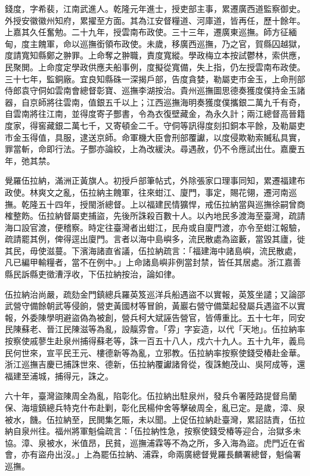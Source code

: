 \begin{pinyinscope}
錢度，字希裴，江南武進人。乾隆元年進士，授吏部主事，累遷廣西道監察御史。外授安徽徽州知府，累擢至方面。其為江安督糧道、河庫道，皆再任，歷十餘年。上嘉其久任奮勉。二十九年，授雲南布政使。三十三年，遷廣東巡撫。師方征緬甸，度主餽軍，命以巡撫銜領布政使。未歲，移廣西巡撫，乃之官，賀縣囚越獄，度請寬知縣鄭之翀罪。上命奪之翀職，責度寬縱。學政梅立本按試鬱林，索供應，民聚閧。上命度定學政供應夫船事例，度擬從寬備，失上指，仍左授雲南布政使。三十七年，監銅廠。宜良知縣硃一深揭戶部，告度貪婪，勒屬吏市金玉，上命刑部侍郎袁守侗如雲南會總督彰寶、巡撫李湖按治。貴州巡撫圖思德奏獲度僕持金玉諸器，自京師將往雲南，值銀五千以上；江西巡撫海明奏獲度僕攜銀二萬九千有奇，自雲南將往江南，並得度寄子酆書，令為衣復壁藏金，為永久計；兩江總督高晉籍度家，得窖藏銀二萬七千，又寄頓金二千。守侗等訊得度刻扣銅本平餘，及勒屬吏市金玉得值，具服，逮送京師。命軍機大臣會刑部覆讞，以度侵欺勒索贓私具實，罪當斬，命即行法。子酆亦論絞，上為改緩決。尋遇赦，仍不令應試出仕。嘉慶五年，弛其禁。

覺羅伍拉納，滿洲正黃旗人。初授戶部筆帖式，外除張家口理事同知，累遷福建布政使。林爽文之亂，伍拉納主餽軍，往來蚶江、廈門，事定，賜花翎，遷河南巡撫。乾隆五十四年，授閩浙總督。上以福建民情獷悍，戒伍拉納當與巡撫徐嗣曾商榷整飭。伍拉納督屬吏捕盜，先後所誅殺百數十人。以內地民多渡海至臺灣，疏請海口設官渡，便稽察。時定往臺灣者出蚶江，民舟或自廈門渡，亦令至蚶江報驗，疏請罷其例，俾得逕出廈門。言者以海中島嶼多，流民散處為盜藪，當毀其廬，徙其民，毋使滋蔓。下濱海諸直省議，伍拉納疏言：「福建海中諸島嶼，流民散處，凡已編甲輸糧者，當不在例中。」上命諸島嶼非例當封禁，皆任其居處。浙江嘉善縣民訴縣吏徵漕浮收，下伍拉納按治，論如律。

伍拉納治尚嚴，疏劾金門鎮總兵羅英笈巡洋兵船遇盜不以實報，英笈坐譴；又論邵武營守備餘朝武等侵餉，營吏黃國材等冒餉，黃巖右營守備葉起發屬兵遇盜不以實報，外委陳學明避盜偽為被創，營兵柯大斌誣告營官，皆傅重比。五十七年，同安民陳蘇老、晉江民陳滋等為亂，設靝雰會。「雰」字妄造，以代「天地」。伍拉納率按察使戚蓼生赴泉州捕得蘇老等，誅一百五十八人，戍六十九人。五十九年，義烏民何世來，宣平民王元、樓德新等為亂，立邪教。伍拉納率按察使錢受椿赴金華。浙江巡撫吉慶已捕誅世來、德新，伍拉納覆讞諸脅從，復誅鮑茂山、吳阿成等，還福建至浦城，捕得元，誅之。

六十年，臺灣盜陳周全為亂，陷彰化。伍拉納出駐泉州，發兵令署陸路提督烏蘭保、海壇鎮總兵特克什布赴剿，彰化民楊仲舍等擊破周全，亂已定。是歲，漳、泉被水，饑。伍拉納至，民閧集乞賑，未以聞。上促伍拉納赴臺灣，累詔詰責，伍拉納自泉州往。福州將軍魁倫疏言：「伍拉納性急，按察使錢受椿等迎合，治獄多未協。漳、泉被水，米值昂，民貧，巡撫浦霖等不為之所，多入海為盜。虎門近在省會，亦有盜舟出沒。」上為罷伍拉納、浦霖，命兩廣總督覺羅長麟署總督，魁倫署巡撫。


\end{pinyinscope}

